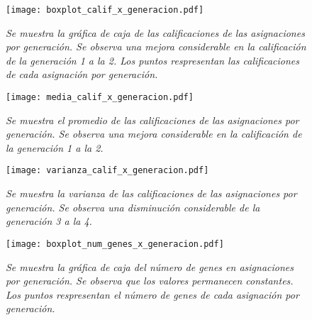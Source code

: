 \begin{figure}[H]
\centering
\texttt{[image: boxplot\_calif\_x\_generacion.pdf]} %
\caption[\textit{Gráfica de caja de calificaciones de asignaciones por generación}]{\textit{Se muestra la gráfica de caja de las calificaciones de las asignaciones por generación. Se observa una mejora considerable en la calificación de la generación 1 a la 2. Los puntos respresentan las calificaciones de cada asignación por generación.}}\label{boxplot_calif_x_generacion}
\end{figure}

\begin{figure}[H]
\centering
\texttt{[image: media\_calif\_x\_generacion.pdf]} %
\caption[\textit{Media de calificaciones de asignaciones por generación}]{\textit{Se muestra el promedio de las calificaciones de las asignaciones por generación. Se observa una mejora considerable en la calificación de la generación 1 a la 2.}}\label{media_calif_x_generacion}
\end{figure}


\begin{figure}[H]
\centering
\texttt{[image: varianza\_calif\_x\_generacion.pdf]} %
\caption[\textit{Varianza de calificaciones de asignaciones por generación}]{\textit{Se muestra la varianza de las calificaciones de las asignaciones por generación. Se observa una disminución considerable de la generación 3 a la 4.}}\label{var_calif_x_generacion}
\end{figure}


\begin{figure}[H]
\centering
\texttt{[image: boxplot\_num\_genes\_x\_generacion.pdf]} %
\caption[\textit{Gráfica de caja del número de genes en asignaciones por generación}]{\textit{Se muestra la gráfica de caja del número de genes en asignaciones por generación. Se observa que los valores permanecen constantes. Los puntos respresentan el número de genes de cada asignación por generación.}}\label{boxplot_num_genes_x_generacion}
\end{figure}


%

